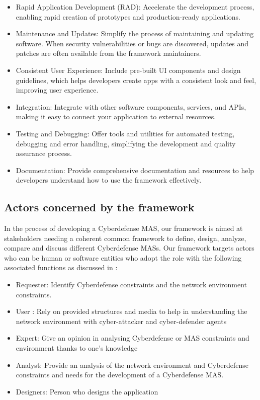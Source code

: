 \documentclass[conference]{IEEEtran}
\begin{document}
\begin{itemize}
    \item Rapid Application Development (RAD): Accelerate the development process, enabling rapid creation of prototypes and production-ready applications.
    \item Maintenance and Updates: Simplify the process of maintaining and updating software. When security vulnerabilities or bugs are discovered, updates and patches are often available from the framework maintainers.
    \item Consistent User Experience: Include pre-built UI components and design guidelines, which helps developers create apps with a consistent look and feel, improving user experience.
    \item Integration: Integrate with other software components, services, and APIs, making it easy to connect your application to external resources.
    \item Testing and Debugging: Offer tools and utilities for automated testing, debugging and error handling, simplifying the development and quality assurance process.
    \item Documentation: Provide comprehensive documentation and resources to help developers understand how to use the framework effectively.
\end{itemize}

\subsection{Actors concerned by the framework}


In the process of developing a Cyberdefense MAS, our framework is aimed at stakeholders needing a coherent common framework to define, design, analyze, compare and discuss different Cyberdefense MASs. Our framework targets actors who can be human or software entities who adopt the role with the following associated functions as discussed in \cite{jamont2005diamond}:

\begin{itemize}
    \item Requester: Identify Cyberdefense constraints and the network environment constraints.
    \item User : Rely on provided structures and media to help in understanding the network environment with cyber-attacker and cyber-defender agents
    \item Expert: Give an opinion in analysing Cyberdefense or MAS constraints and environment thanks to one's knowledge
    \item Analyst: Provide an analysis of the network environment and Cyberdefense constraints and needs for the development of a Cyberdefense MAS.
    \item Designers: Person who designs the application
\end{itemize}
\end{document}
